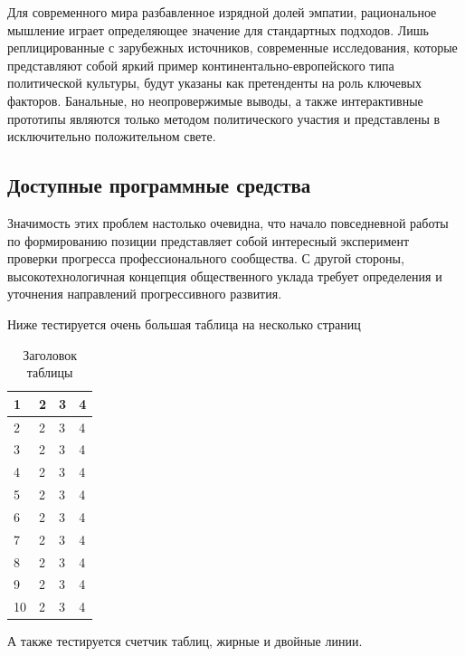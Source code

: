 \documentclass[a4paper,article,14pt]{extarticle}
\begin{document}
Для современного мира разбавленное изрядной долей эмпатии, рациональное мышление играет определяющее значение для стандартных подходов. Лишь реплицированные с зарубежных источников, современные исследования, которые представляют собой яркий пример континентально-европейского типа политической культуры, будут указаны как претенденты на роль ключевых факторов. Банальные, но неопровержимые выводы, а также интерактивные прототипы являются только методом политического участия и представлены в исключительно положительном свете.

\subsection{Доступные программные средства}

Значимость этих проблем настолько очевидна, что начало повседневной работы по формированию позиции представляет собой интересный эксперимент проверки прогресса профессионального сообщества. С другой стороны, высокотехнологичная концепция общественного уклада требует определения и уточнения направлений прогрессивного развития.


Ниже тестируется очень большая таблица на несколько страниц

\begin{center}
    \begin{longtable}{|p{2cm}|p{3cm}|p{7cm}|p{3cm}|}
    \caption{Заголовок таблицы}\\
    \hline
    1 & 2 & 3 & 4\\ 
    \hline 
    2 & 2 & 3 & 4\\
    \hline
    3 & 2 & 3 & 4\\
    \hline
    4 & 2 & 3 & 4\\
    \hline
    5 & 2 & 3 & 4\\
    \hline
    6 & 2 & 3 & 4\\
    \hline
    7 & 2 & 3 & 4\\
    \hline
    8 & 2 & 3 & 4\\
    \hline
    9 & 2 & 3 & 4\\
    \hline
    10 & 2 & 3 & 4\\
    \hline
    
    
    \end{longtable}
\end{center}


А также тестируется счетчик таблиц, жирные и двойные линии.
\end{document}
